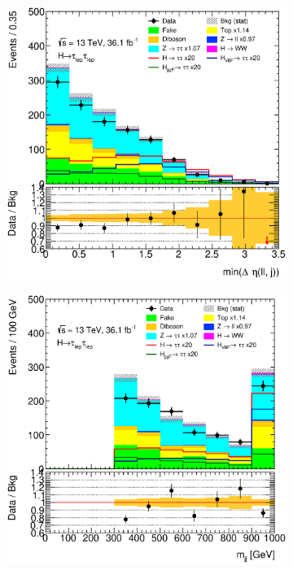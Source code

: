 \begin{figure}[htb]
\begin{subfigure}[t]{0.3\textwidth}
    \end{subfigure}
    \begin{subfigure}[t]{0.3\textwidth}
        \includegraphics[width=\textwidth]{./plots/mva/modeling/input_vars/VBF_DF/ll-CutMVAVBFCatDF-MinDEtaDilepJets-lin.eps}
    \end{subfigure}
    \begin{subfigure}[t]{0.3\textwidth}
        \includegraphics[width=\textwidth]{./plots/mva/modeling/input_vars/VBF_DF/ll-CutMVAVBFCatDF-Mjj-lin.eps}

\end{subfigure}
\end{figure}

